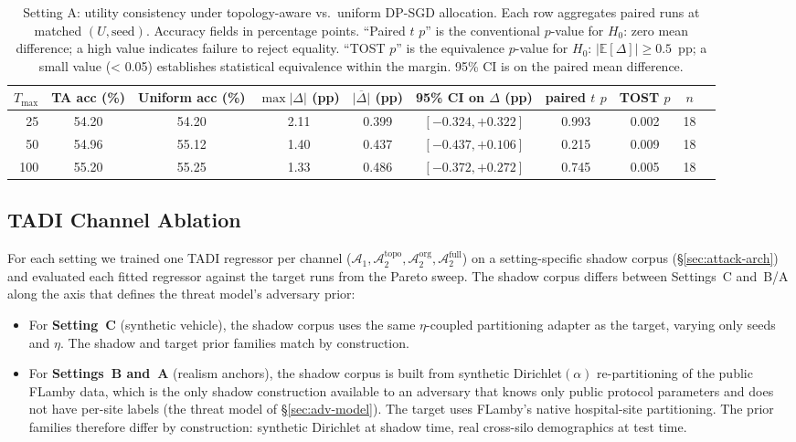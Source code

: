 \documentclass[letterpaper,journal]{IEEEtran}
\newcommand{\TADI}{\textsc{TADI}\xspace}
\newcommand{\Adv}{\mathcal{A}}
\begin{document}
\begin{table}[t]
\centering
\caption{Setting A: utility consistency under topology-aware vs.\ uniform DP-SGD allocation. Each row aggregates paired runs at matched $(U, \text{seed})$. Accuracy fields in percentage points. ``Paired $t$ $p$'' is the conventional $p$-value for $H_0$: zero mean difference; a high value indicates failure to reject equality. ``TOST $p$'' is the equivalence $p$-value for $H_0$: $|\mathbb{E}[\Delta]|\ge 0.5$~pp; a small value (< 0.05) establishes statistical equivalence within the margin. 95\% CI is on the paired mean difference.}
\label{tab:util-consistency-a}
\begin{tabular}{@{}rccccccccc@{}}
\toprule
$T_{\max}$ & TA acc (\%) & Uniform acc (\%) & $\max|\Delta|$ (pp) & $\overline{|\Delta|}$ (pp) & 95\% CI on $\Delta$ (pp) & paired $t$ $p$ & TOST $p$ & $n$ \\
\midrule
25 & 54.20 & 54.20 & 2.11 & 0.399 & $[-0.324, +0.322]$ & 0.993 & 0.002 & 18 \\
50 & 54.96 & 55.12 & 1.40 & 0.437 & $[-0.437, +0.106]$ & 0.215 & 0.009 & 18 \\
100 & 55.20 & 55.25 & 1.33 & 0.486 & $[-0.372, +0.272]$ & 0.745 & 0.005 & 18 \\
\bottomrule
\end{tabular}
\end{table}

\subsection{TADI Channel Ablation}
\label{sec:experiments-channels}

For each setting we trained one \TADI regressor per channel
($\Adv_1, \Adv_2^{\text{topo}}, \Adv_2^{\text{org}}, \Adv_2^{\text{full}}$)
on a setting-specific shadow corpus (\S\ref{sec:attack-arch}) and
evaluated each fitted regressor against the target runs from the
Pareto sweep. The shadow corpus differs between Settings~C and~B/A
along the axis that defines the threat model's adversary prior:

\begin{itemize}[topsep=2pt,itemsep=2pt,leftmargin=*]
\item For \textbf{Setting~C} (synthetic vehicle), the shadow corpus
  uses the same $\eta$-coupled partitioning adapter as the target,
  varying only seeds and $\eta$. The shadow and target prior families
  match by construction.
\item For \textbf{Settings~B and~A} (realism anchors), the shadow
  corpus is built from synthetic Dirichlet$(\alpha)$ re-partitioning of
  the public FLamby data, which is the only shadow construction
  available to an adversary that knows only public protocol parameters
  and does not have per-site labels (the threat model of
  \S\ref{sec:adv-model}). The target uses FLamby's native hospital-site
  partitioning. The prior families therefore differ by construction:
  synthetic Dirichlet at shadow time, real cross-silo demographics at
  test time.
\end{itemize}
\end{document}

